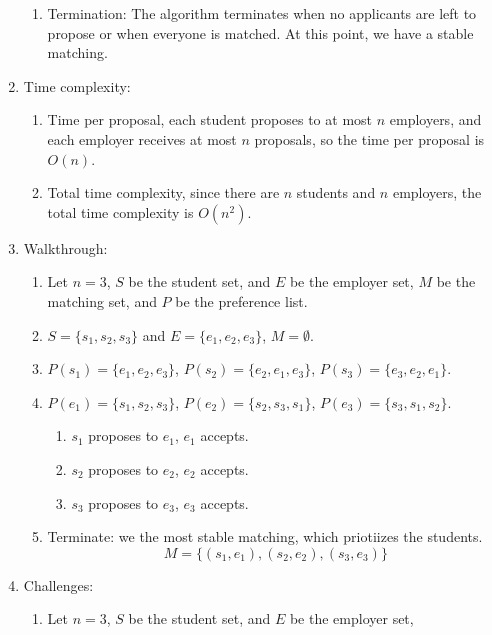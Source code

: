 \documentclass[12pt]{article}
\begin{document}
\begin{enumerate}
\begin{enumerate}
                \item Termination: The algorithm terminates when no 
                applicants are left to propose or when everyone is matched. 
                At this point, we have a stable matching.
            \end{enumerate}
        \item Time complexity: 
            \begin{enumerate}
                \item Time per proposal, each student proposes to at most $n$ employers, 
                and each employer receives at most $n$ proposals, so the time per proposal is $O(n)$.
                \item Total time complexity, since there are $n$ students and $n$ employers,
                the total time complexity is $O(n^2)$.
            \end{enumerate}
        \item Walkthrough:
            \begin{enumerate}
                \item Let $n = 3$, $S$ be the student set, and $E$ be the employer set,
                 $M$ be the matching set, and $P$ be the preference list.
                \item $S = \{s_1, s_2, s_3\}$ and $E = \{e_1, e_2, e_3\}$, $M = \emptyset$.
                \item $P(s_1) = \{e_1, e_2, e_3\}$, $P(s_2) = \{e_2, e_1, e_3\}$, $P(s_3) = \{e_3, e_2, e_1\}$.
                \item $P(e_1) = \{s_1, s_2, s_3\}$, $P(e_2) = \{s_2, s_3, s_1\}$, $P(e_3) = \{s_3, s_1, s_2\}$.
                \begin{enumerate}
                    \item $s_1$ proposes to $e_1$, $e_1$ accepts.
                    \item $s_2$ proposes to $e_2$, $e_2$ accepts.
                    \item $s_3$ proposes to $e_3$, $e_3$ accepts.
                \end{enumerate}
                \item Terminate: we the most stable matching, which priotiizes the students.
                \[M = \{(s_1, e_1), (s_2, e_2), (s_3, e_3)\}\]
            \end{enumerate}
        \item Challenges:
            \begin{enumerate}
                \item Let $n = 3$, $S$ be the student set, and $E$ be the employer set,

\end{enumerate}
\end{enumerate}
\end{document}
